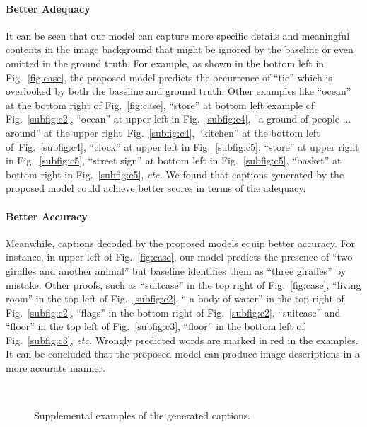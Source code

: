 \documentclass[11pt]{article}
\begin{document}
\paragraph{Better Adequacy} It can be seen that our model can capture more specific details and meaningful contents in the image background that might be ignored by the baseline or even omitted in the ground truth. For example, as shown in the bottom left in Fig.~\ref{fig:case}, the proposed model predicts the occurrence of ``tie'' which is overlooked by both the baseline and ground truth. Other examples like ``ocean'' at the bottom right of Fig.~\ref{fig:case}, ``store'' at bottom left example of Fig.~\ref{subfig:c2}, ``ocean'' at upper left in Fig.~\ref{subfig:c4}, ``a ground of people ... around'' at the upper right~Fig.~\ref{subfig:c4}, ``kitchen'' at the bottom left of~Fig.~\ref{subfig:c4}, ``clock'' at upper left in Fig.~\ref{subfig:c5}, ``store'' at upper right in Fig.~\ref{subfig:c5}, ``street sign'' at bottom left in Fig.~\ref{subfig:c5}, ``basket'' at bottom right in Fig.~\ref{subfig:c5}, \emph{etc.} We found that captions generated by the proposed model could achieve better scores in terms of the adequacy.

\paragraph{Better Accuracy}
Meanwhile, captions decoded by the proposed models equip better accuracy. For instance, in upper left of Fig.~\ref{fig:case}, our model predicts the presence of ``two giraffes and another animal'' but baseline identifies them as ``three giraffes'' by mistake. Other proofs, such as ``suitcase'' in the top right of Fig.~\ref{fig:case}, ``living room'' in the top left of Fig.~\ref{subfig:c2}, `` a body of water'' in the top right of Fig.~\ref{subfig:c2}, ``flags'' in the bottom right of Fig.~\ref{subfig:c2}, ``suitcase'' and ``floor'' in the top left of Fig.~\ref{subfig:c3}, ``floor'' in the bottom left of Fig.~\ref{subfig:c3}, \emph{etc.}
Wrongly predicted words are marked in red in the examples. It can be concluded that the proposed model can produce image descriptions in a more accurate manner.





\begin{figure*}[htp]
  \centering
  \\
  \caption{Supplemental examples of the generated captions.}\label{fig:case2}
\end{figure*}
\end{document}
